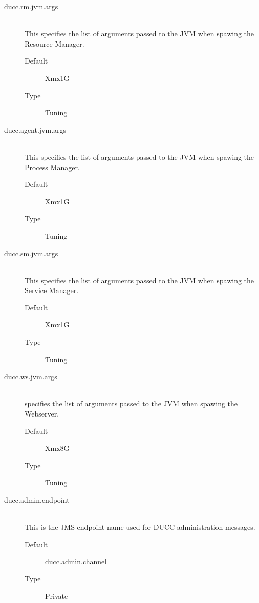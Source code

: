 \begin{description}
       \item[ducc.rm.jvm.args] \hfill \\
         This specifies the list of arguments passed to the JVM when spawing the Resource 
         Manager. 
         \begin{description}           
           \item[Default] Xmx1G 
           \item[Type] Tuning 
         \end{description}

       \item[ducc.agent.jvm.args] \hfill \\
         This specifies the list of arguments passed to the JVM when spawing the Process Manager. 
         \begin{description}
           \item[Default] Xmx1G 
           \item[Type] Tuning 
         \end{description}

       \item[ducc.sm.jvm.args] \hfill \\
         This specifies the list of arguments passed to the JVM when spawing the Service Manager. 
         \begin{description}
           \item[Default] Xmx1G 
           \item[Type] Tuning 
         \end{description}

       \item[ducc.ws.jvm.args] \hfill \\
         specifies the list of arguments passed to the JVM when spawing the Webserver. 
         \begin{description}
           \item[Default] Xmx8G 
           \item[Type] Tuning 
         \end{description}

       \item[ducc.admin.endpoint] \hfill \\
         This is the JMS endpoint name used for DUCC administration messages. 
         \begin{description}
           \item[Default] ducc.admin.channel 
           \item[Type] Private 
         \end{description}


\end{description}
